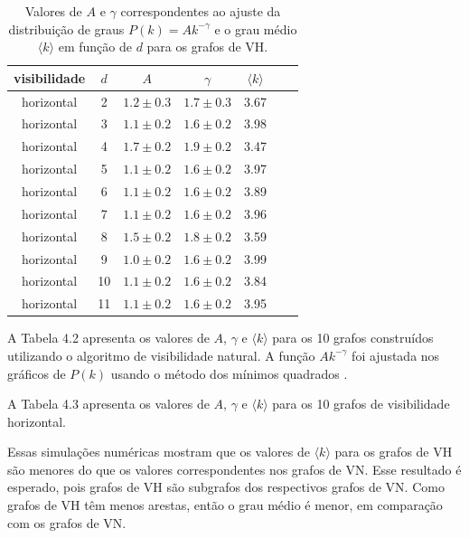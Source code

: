 \documentclass[12pt,a4paper,fleqn]{report}
\begin{document}
\begin{table}[H]
\begin{center}
\caption{Valores de $A$ e $\gamma$ correspondentes ao ajuste da distribuição de graus
$P(k)=A k^{-\gamma}$ e o grau médio $\langle k \rangle $ em função de $d$
para os grafos de VH.} \vskip 1cm
\begin{tabular}{|c|c|c|c|c|c|c|}\hline
        visibilidade & $d$ & $A$ & $\gamma$  & $\langle k \rangle $ \\
        \hline
horizontal & 2 & $1.2 \pm 0.3$  & $1.7 \pm 0.3$ & 3.67 \\
horizontal & 3 & $1.1 \pm 0.2$  & $1.6 \pm 0.2$ & 3.98 \\
horizontal & 4 & $1.7 \pm 0.2$  & $1.9 \pm 0.2$ & 3.47 \\
horizontal & 5 & $1.1 \pm 0.2$  & $1.6 \pm 0.2$ & 3.97 \\
horizontal & 6 & $1.1 \pm 0.2$  & $1.6 \pm 0.2$ & 3.89 \\
horizontal & 7 & $1.1 \pm 0.2$  & $1.6 \pm 0.2$ & 3.96 \\
horizontal & 8 & $1.5 \pm 0.2$  & $1.8 \pm 0.2$ & 3.59 \\
horizontal & 9 & $1.0 \pm 0.2$  & $1.6 \pm 0.2$ & 3.99 \\
horizontal & 10 & $1.1 \pm 0.2$ & $1.6 \pm 0.2$ & 3.84 \\
horizontal & 11 & $1.1 \pm 0.2$ & $1.6 \pm 0.2$ & 3.95 \\
        \hline
    \end{tabular}
    \label{tab:horizontal-stats}
\end{center}
\end{table}

A Tabela 4.2 apresenta os valores de
$A$, $\gamma$ e  $\langle k \rangle$ para os 10 grafos construídos
utilizando o algoritmo de visibilidade natural. A função $Ak^{-\gamma}$ foi ajustada nos gráficos de $P(k)$ usando o método dos mínimos quadrados \cite{b03}.

A Tabela 4.3 apresenta os  valores de $A$, $\gamma$ e $\langle k \rangle $
para os 10 grafos de visibilidade horizontal.

Essas simulações numéricas mostram que os
valores de $\langle k \rangle$ para os grafos de VH
são menores do que os valores correspondentes nos grafos de VN. Esse resultado é esperado, pois grafos de VH são subgrafos dos respectivos
grafos de VN. Como grafos de VH têm menos arestas, então o grau médio é menor, em comparação com os grafos de VN.
\end{document}
